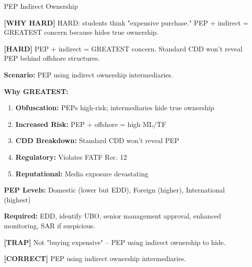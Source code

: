 \documentclass[6pt,aspectratio=169,fontsize=5pt]{beamer}
\renewcommand{\tiny}{\fontsize{3.5pt}{4.5pt}\selectfont}
\renewcommand{\normalsize}{\fontsize{7.5pt}{8.5pt}\selectfont}
\newcommand{\trap}[1]{%
	\begin{block}{\textcolor{redtrap}{\textbf{[TRAP]}}}
		\textcolor{redtrap}{\tiny #1}
	\end{block}
}
\newcommand{\correct}[1]{%
	\begin{block}{\textcolor{greencorrect}{\textbf{[CORRECT]}}}
		\textcolor{greencorrect}{\tiny #1}
	\end{block}
}
\newcommand{\hard}[1]{%
	\begin{block}{\textcolor{hardcolor}{\textbf{[HARD]}}}
		\textcolor{hardcolor}{\tiny #1}
	\end{block}
}
\newcommand{\hardexplain}[1]{%
	\begin{block}{\textcolor{orangehard}{\textbf{[WHY HARD]}}}
		\textcolor{orangehard}{\tiny #1}
	\end{block}
}
\begin{document}
	\begin{frame}{\normalsize PEP Indirect Ownership}
		
		\hardexplain{HARD: students think "expensive purchase." PEP + indirect = GREATEST concern because hides true ownership.}
		
		\hard{PEP + indirect = GREATEST concern. Standard CDD won't reveal PEP behind offshore structures.}
		
		\textbf{Scenario:} PEP using indirect ownership intermediaries.
		
		\textbf{Why GREATEST:}
		\begin{enumerate}
			\item \textbf{Obfuscation:} PEPs high-risk; intermediaries hide true ownership
			\item \textbf{Increased Risk:} PEP + offshore = high ML/TF
			\item \textbf{CDD Breakdown:} Standard CDD won't reveal PEP
			\item \textbf{Regulatory:} Violates FATF Rec. 12
			\item \textbf{Reputational:} Media exposure devastating
		\end{enumerate}
		
		\textbf{PEP Levels:} Domestic (lower but EDD), Foreign (higher), International (highest)
		
		\textbf{Required:} EDD, identify UBO, senior management approval, enhanced monitoring, SAR if suspicious.
		
		\trap{Not "buying expensive" -- PEP using indirect ownership to hide.}
		
		\correct{PEP using indirect ownership intermediaries.}
	\end{frame}
	
\end{document}
